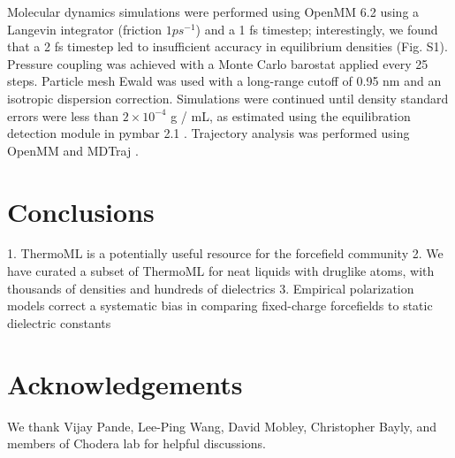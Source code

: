 \documentclass[journal=jacsat,manuscript=article]{achemso}
\begin{document}
Molecular dynamics simulations were performed using OpenMM 6.2 using a Langevin integrator (friction $1 ps^{-1}$) and a 1 fs timestep; interestingly, we found that a 2 fs timestep led to insufficient accuracy in equilibrium densities (Fig. S1).  Pressure coupling was achieved with a Monte Carlo barostat applied every 25 steps.  Particle mesh Ewald \cite{Darden1993} was used with a long-range cutoff of 0.95 nm and an isotropic dispersion correction.  Simulations were continued until density standard errors were less than $2 \times 10^{-4}$ g / mL, as estimated using the equilibration detection module in pymbar 2.1 \cite{shirts2008statistically}.  Trajectory analysis was performed using OpenMM \cite{eastman2012openmm} and MDTraj \cite{mcgibbon2014mdtraj}.  

\section{Conclusions}

1.  ThermoML is a potentially useful resource for the forcefield community
2.  We have curated a subset of ThermoML for neat liquids with druglike atoms, with thousands of densities and hundreds of dielectrics
3.  Empirical polarization models correct a systematic bias in comparing fixed-charge forcefields to static dielectric constants


\section{Acknowledgements}

We thank Vijay Pande, Lee-Ping Wang, David Mobley, Christopher Bayly, and members of Chodera lab for helpful discussions.  


\end{document}
